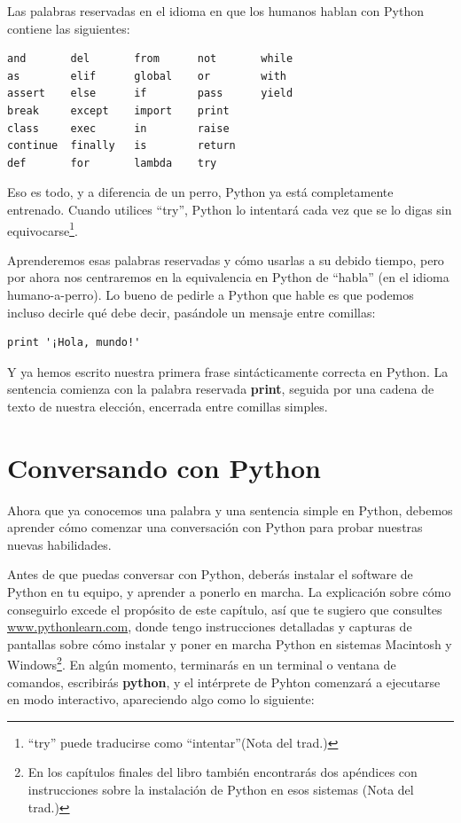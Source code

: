 Las palabras reservadas en el idioma en que los humanos hablan con
Python contiene las siguientes:

\beforeverb
\begin{verbatim}
and       del       from      not       while    
as        elif      global    or        with     
assert    else      if        pass      yield    
break     except    import    print              
class     exec      in        raise              
continue  finally   is        return             
def       for       lambda    try
\end{verbatim}
\afterverb
%
Eso es todo, y a diferencia de un perro, Python ya está completamente entrenado.
Cuando utilices ``try'', Python lo intentará cada vez que se lo digas sin
equivocarse\footnote{``try'' puede traducirse como ``intentar''(Nota del trad.)}.

Aprenderemos esas palabras reservadas y cómo usarlas a su debido tiempo,
pero por ahora nos centraremos en la equivalencia en Python de ``habla''
(en el idioma humano-a-perro). Lo bueno de pedirle a Python que hable
es que podemos incluso decirle qué debe decir, pasándole un mensaje entre comillas:

\beforeverb
\begin{verbatim}
print '¡Hola, mundo!'
\end{verbatim}
\afterverb

Y ya hemos escrito nuestra primera frase sintácticamente correcta en Python.
La sentencia comienza con la palabra reservada {\bf print}, seguida
por una cadena de texto de nuestra elección, encerrada entre comillas simples.

\section{Conversando con Python}

Ahora que ya conocemos una palabra y una sentencia simple en Python,
debemos aprender cómo comenzar una conversación con Python para probar
nuestras nuevas habilidades.

Antes de que puedas conversar con Python, deberás instalar
el software de Python en tu equipo, y aprender a ponerlo en marcha.
La explicación sobre cómo conseguirlo excede el propósito de este capítulo,
así que te sugiero que consultes \url{www.pythonlearn.com}, donde tengo
instrucciones detalladas y capturas de pantallas sobre cómo instalar y poner en marcha
Python en sistemas Macintosh y Windows\footnote{En los capítulos finales del libro también
encontrarás dos apéndices con instrucciones sobre la instalación de Python en esos sistemas (Nota
del trad.)}. En algún momento, terminarás en un terminal
o ventana de comandos, escribirás {\bf python}, y el intérprete de Pyhton
comenzará a ejecutarse en modo interactivo, apareciendo algo como lo siguiente:

